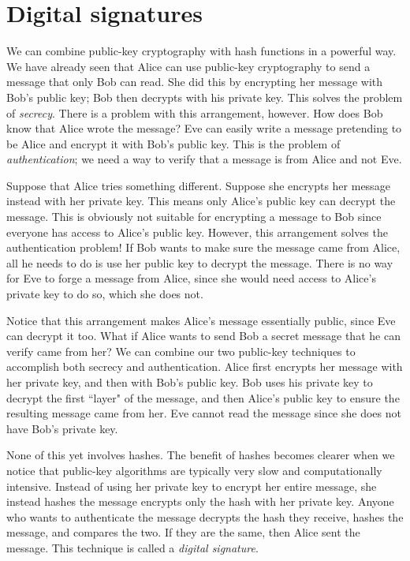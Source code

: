 \documentclass{book}
\theoremstyle{plain}
\theoremstyle{definition}
\begin{document}
\section{Digital signatures}
We can combine public-key cryptography with hash functions in a powerful way. We have already seen that Alice can use public-key cryptography to send a message that only Bob can read. She did this by encrypting her message with Bob's public key; Bob then decrypts with his private key. This solves the problem of {\it secrecy}. There is a problem with this arrangement, however. How does Bob know that Alice wrote the message? Eve can easily write a message pretending to be Alice and encrypt it with Bob's public key. This is the problem of {\it authentication}; we need a way to verify that a message is from Alice and not Eve.

Suppose that Alice tries something different. Suppose she encrypts her message instead with her private key. This means only Alice's public key can decrypt the message. This is obviously not suitable for encrypting a message to Bob since everyone has access to Alice's public key. However, this arrangement solves the authentication problem! If Bob wants to make sure the message came from Alice, all he needs to do is use her public key to decrypt the message. There is no way for Eve to forge a message from Alice, since she would need access to Alice's private key to do so, which she does not.

Notice that this arrangement makes Alice's message essentially public, since Eve can decrypt it too. What if Alice wants to send Bob a secret message that he can verify came from her? We can combine our two public-key techniques to accomplish both secrecy and authentication. Alice first encrypts her message with her private key, and then with Bob's public key. Bob uses his private key to decrypt the first ``layer" of the message, and then Alice's public key to ensure the resulting message came from her. Eve cannot read the message since she does not have Bob's private key.

None of this yet involves hashes. The benefit of hashes becomes clearer when we notice that public-key algorithms are typically very slow and computationally intensive. Instead of using her private key to encrypt her entire message, she instead hashes the message encrypts only the hash with her private key. Anyone who wants to authenticate the message decrypts the hash they receive, hashes the message, and compares the two. If they are the same, then Alice sent the message. This technique is called a {\it digital signature}.
\end{document}
